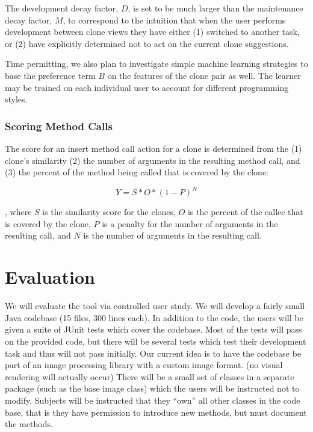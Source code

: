 \documentclass[preprint,10pt]{sigplanconf}
\begin{document}
The development decay factor, $D$, is set to be much larger than the
maintenance decay factor, $M$, to correspond to the intuition that
when the user performs development between clone views they have
either (1) switched to another task, or (2) have explicitly determined
not to act on the current clone suggestions.

Time permitting, we also plan to investigate simple machine learning
strategies to base the preference term $B$ on the features of the
clone pair as well. The learner may
be trained on each individual user to
account for different programming styles.

\subsubsection{Scoring Method Calls}
The score for an insert method call action for a clone is determined
from the (1) clone's similarity (2) the number of arguments in the
resulting method call, and (3) the percent of the method being called
that is covered by the clone:

\begin{equation}
  Y = S * O * (1 - P)^N
\end{equation}

\noindent, where $S$ is the similarity score for the clones, $O$ is
the percent of the callee that is covered by the clone, $P$ is a
penalty for the number of arguments in the resulting call, and $N$ is
the number of arguments in the resulting call. 

\section{Evaluation}
\label{sec:eval}


We will evaluate the tool via controlled user study. We will develop a fairly small 
Java codebase (15 files, 300 lines each). In addition to the code, the users will be
given a suite of JUnit tests which cover the codebase.  Most of the tests will pass
 on the provided code, 
but there will be several tests which test their development task and 
thus will not pass initially.  Our current idea is to have the codebase be part of an image processing library with a custom image format. (no visual rendering will actually occur) There will be a small set of classes in a separate package (such as the base image class) which the users will be instructed not to modify. Subjects will be instructed that they ``own'' all other classes in the code base, that is they have permission to introduce new methods, but must document the
methods.  
\end{document}
